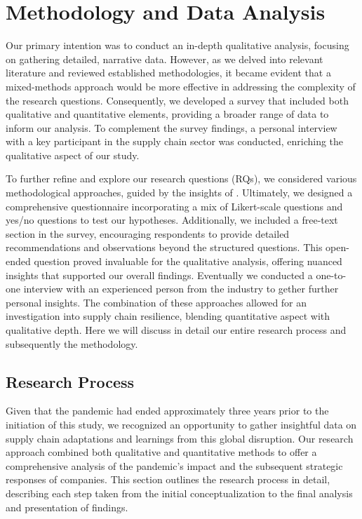 \chapter{Methodology and Data Analysis}

 Our primary intention was to conduct an in-depth qualitative analysis, focusing on gathering detailed, narrative data. However, as we delved into relevant literature and reviewed established methodologies, it became evident that a mixed-methods approach would be more effective in addressing the complexity of the research questions. Consequently, we developed a survey that included both qualitative and quantitative elements, providing a broader range of data to inform our analysis. To complement the survey findings, a personal interview with a key participant in the supply chain sector was conducted, enriching the qualitative aspect of our study.

To further refine and explore our research questions (RQs), we considered various methodological approaches, guided by the insights of \textcite{Ghauri2020ResearchStudies}. Ultimately, we designed a comprehensive questionnaire incorporating a mix of Likert-scale questions \parencite{Joshi2015LikertExplained,Batterton2017MilitaryIt,Mirahmadizadeh2018DesigningData} and yes/no questions to test our hypotheses. Additionally, we included a free-text section in the survey, encouraging respondents to provide detailed recommendations and observations beyond the structured questions. This open-ended question proved invaluable for the qualitative analysis, offering nuanced insights that supported our overall findings. Eventually we conducted a one-to-one interview with an experienced person from the industry to gether further personal insights. The combination of these approaches allowed for an investigation into supply chain resilience, blending quantitative aspect with qualitative depth. Here we will discuss in detail our entire research process and subsequently the methodology.

\section{Research Process}

Given that the pandemic had ended approximately three years prior to the initiation of this study, we recognized an opportunity to gather insightful data on supply chain adaptations and learnings from this global disruption. Our research approach combined both qualitative and quantitative methods to offer a comprehensive analysis of the pandemic's impact and the subsequent strategic responses of companies. This section outlines the research process in detail, describing each step taken from the initial conceptualization to the final analysis and presentation of findings.

